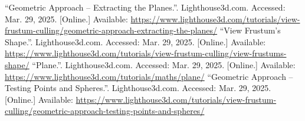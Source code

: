 \documentclass[12pt, a4paper]{article}
\begin{document}
\begin{thebibliography}{9}
        ``Geometric Approach -- Extracting the Planes.''. Lighthouse3d.com. Accessed:
        Mar. 29, 2025. [Online.] Available:
        \url{https://www.lighthouse3d.com/tutorials/view-frustum-culling/geometric-approach-extracting-the-planes/}
        ``View Frustum’s Shape.''. Lighthouse3d.com. Accessed:
        Mar. 29, 2025. [Online.] Available:
        \url{https://www.lighthouse3d.com/tutorials/view-frustum-culling/view-frustums-shape/}
        ``Plane.''. Lighthouse3d.com. Accessed:
        Mar. 29, 2025. [Online.] Available:
        \url{https://www.lighthouse3d.com/tutorials/maths/plane/}
        ``Geometric Approach -- Testing Points and Spheres.''. Lighthouse3d.com. Accessed:
        Mar. 29, 2025. [Online.] Available:
        \url{https://www.lighthouse3d.com/tutorials/view-frustum-culling/geometric-approach-testing-points-and-spheres/}
\end{thebibliography}
\endgroup
\end{document}
